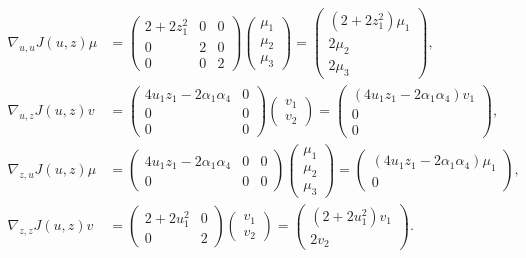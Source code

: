 \documentclass{article}
\begin{document}
\begin{align*}
    \nabla_{u,u}J(u, z)\mu
    &= \left(\begin{array}{ccc}
        2 + 2z_{1}^{2} & 0 & 0
        \\
        0 & 2 & 0
        \\
        0 & 0 & 2
    \end{array}\right)
    \left(\begin{array}{c}
        \mu_{1} \\ \mu_{2} \\ \mu_{3}
    \end{array}\right)
    = \left(\begin{array}{c}
        (2 + 2z_{1}^{2})\mu_{1}
        \\
        2\mu_{2}
        \\
        2\mu_{3}
    \end{array}\right),
    \\
    \nabla_{u,z}J(u, z)v
    &= \left(\begin{array}{cc}
        4u_{1}z_{1} - 2\alpha_{1}\alpha_{4} & 0
        \\ 0 & 0
        \\ 0 & 0
    \end{array}\right)
    \left(\begin{array}{c}
        v_{1} \\ v_{2}
    \end{array}\right)
    = \left(\begin{array}{c}
        (4u_{1}z_{1} - 2\alpha_{1}\alpha_{4})v_{1} \\ 0 \\ 0
    \end{array}\right),
    \\
    \nabla_{z,u}J(u, z)\mu
    &= \left(\begin{array}{ccc}
        4u_{1}z_{1} - 2\alpha_{1}\alpha_{4} & 0 & 0
        \\
        0 & 0 & 0
    \end{array}\right)
    \left(\begin{array}{c}
        \mu_{1} \\ \mu_{2} \\ \mu_{3}
    \end{array}\right)
    = \left(\begin{array}{c}
        (4u_{1}z_{1} - 2\alpha_{1}\alpha_{4})\mu_{1}
        \\
        0
    \end{array}\right),
    \\
    \nabla_{z,z}J(u, z)v
    &= \left(\begin{array}{cc}
        2 + 2u_{1}^{2} & 0
        \\
        0 & 2
    \end{array}\right)
    \left(\begin{array}{c}
        v_{1} \\ v_{2}
    \end{array}\right)
    = \left(\begin{array}{c}
        (2 + 2u_{1}^{2})v_{1}
        \\ 2v_{2}
    \end{array}\right).
\end{align*}
\end{document}
